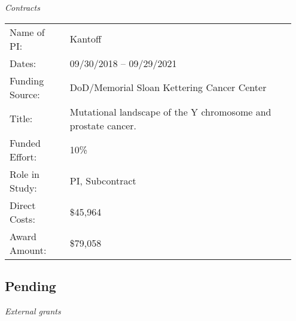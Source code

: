 \documentclass[11pt, a4paper]{article} %
\begin{document}
\emph{Contracts}
\begin{longtable}{@{}p{0.2\linewidth} p{0.75\linewidth}}
Name of PI: & Kantoff\\
Dates: & 09/30/2018 -- 09/29/2021\\
Funding Source: & DoD/Memorial Sloan Kettering Cancer Center\\
Title: & Mutational landscape of the Y chromosome and prostate cancer.\\
Funded Effort: & 10\%\\
Role in Study: & PI, Subcontract \\
Direct Costs: & \$45,964\\
Award Amount: & \$79,058\\
\end{longtable}

\subsection*{Pending}
\emph{External grants}
\end{document}
